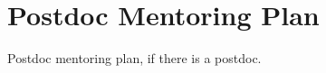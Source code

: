 \documentclass[nsfpostdoc]{nsfproposal}
\begin{document}
\section*{Postdoc Mentoring Plan}

Postdoc mentoring plan, if there is a postdoc. 
\end{document}
